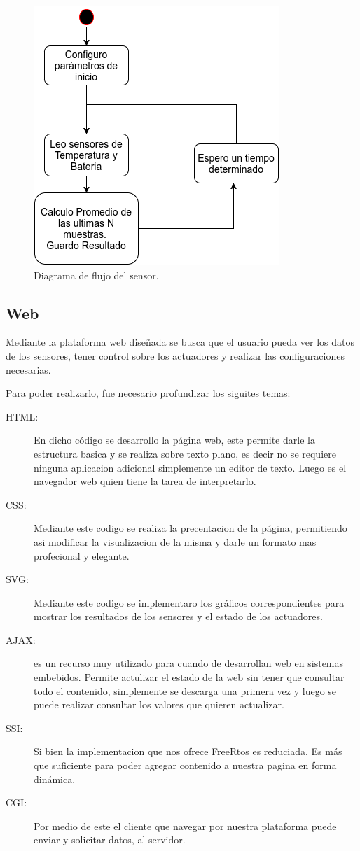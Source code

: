 \begin{figure}[!htb]
  \centering
  \includegraphics[scale=.5]{./Figures/sensor_task.png}
  \caption{Diagrama de flujo del sensor.}
  \label{fig:sensor_task}
\end{figure}

\subsection{Web}
Mediante la plataforma web diseñada se busca que el usuario pueda ver los datos de los sensores, tener control sobre los actuadores y realizar las configuraciones necesarias. 

Para poder realizarlo, fue necesario profundizar los siguites temas:
\begin{description}
    \item[HTML:] En dicho código se desarrollo la página web, este permite darle la estructura basica y se realiza sobre texto plano, es decir no se requiere ninguna aplicacion adicional simplemente un editor de texto. Luego es el navegador web quien tiene la tarea de interpretarlo. 
    \item[CSS:] Mediante este codigo se realiza la precentacion de la página, permitiendo asi modificar la visualizacion de la misma y darle un formato mas profecional y elegante.
    \item[SVG:] Mediante este codigo se implementaro los gráficos correspondientes para mostrar los resultados de los sensores y el estado de los actuadores.
    \item[AJAX:] es un recurso muy utilizado para cuando de desarrollan web en sistemas embebidos. Permite actulizar el estado de la web sin tener que consultar todo el contenido, simplemente se descarga una primera vez y luego se puede realizar consultar los valores que quieren actualizar. 
    \item[SSI:] Si bien la implementacion que nos ofrece FreeRtos es reduciada. Es más que suficiente para poder agregar contenido a nuestra pagina en forma dinámica.
    \item[CGI:] Por medio de este el cliente que navegar por nuestra plataforma puede enviar y solicitar datos, al servidor.
\end{description}

